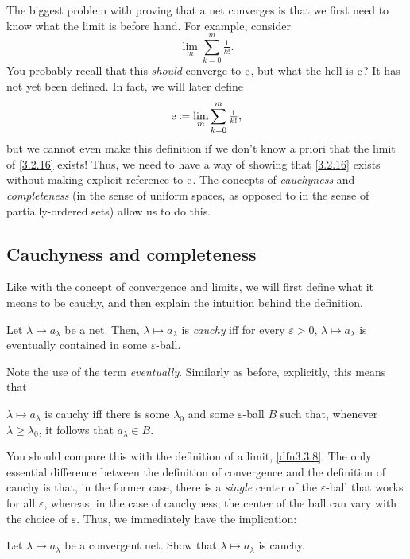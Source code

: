 The biggest problem with proving that a net converges is that we first need to know what the limit is before hand.  For example, consider
\begin{equation}\label{3.2.16}
\lim _m\sum _{k=0}^m\tfrac{1}{k!}.
\end{equation}
You probably recall that this \emph{should} converge to $\mathrm{e}$, but what the hell is $\mathrm{e}$?  It has not yet been defined.  In fact, we will later define
\begin{equation}
\mathrm{e} \coloneqq \lim _m\sum _{k=0}^m\tfrac{1}{k!},
\end{equation}
but we cannot even make this definition if we don't know a priori that the limit of \eqref{3.2.16} exists!  Thus, we need to have a way of showing that \eqref{3.2.16} exists without making explicit reference to $\mathrm{e}$.  The concepts of \emph{cauchyness} and \emph{completeness} (in the sense of uniform spaces, as opposed to in the sense of partially-ordered sets) allow us to do this.

\subsection{Cauchyness and completeness}\label{sbs3.3.3}

Like with the concept of convergence and limits, we will first define what it means to be cauchy, and then explain the intuition behind the definition.
\begin{dfn}[Cauchyness]\label{dfn3.3.26}
Let $\lambda \mapsto a_\lambda$ be a net.  Then, $\lambda \mapsto a_\lambda$ is \emph{cauchy} iff for every $\varepsilon >0$, $\lambda \mapsto a_\lambda$ is eventually contained in some $\varepsilon$-ball.
\begin{rmk}
Note the use of the term \emph{eventually}.  Similarly as before, explicitly, this means that
\begin{textequation}
$\lambda \mapsto a_\lambda$ is cauchy iff there is some $\lambda _0$ and some $\varepsilon$-ball $B$ such that, whenever $\lambda \geq \lambda _0$, it follows that $a_\lambda \in B$.
\end{textequation}
\end{rmk}
\end{dfn}
You should compare this with the definition of a limit, \cref{dfn3.3.8}.  The only essential difference between the definition of convergence and the definition of cauchy is that, in the former case, there is a \emph{single} center of the $\varepsilon$-ball that works for all $\varepsilon$, whereas, in the case of cauchyness, the center of the ball can vary with the choice of $\varepsilon$.  Thus, we immediately have the implication:
\begin{exr}\label{exr3.3.27}
Let $\lambda \mapsto a_\lambda$ be a convergent net.  Show that $\lambda \mapsto a_\lambda$ is cauchy.
\end{exr}

